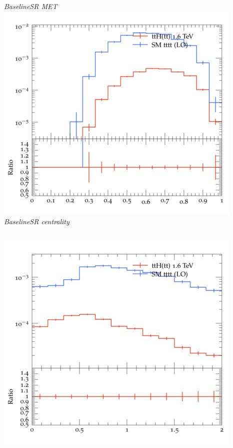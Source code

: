 \documentclass{beamer}
\begin{document}
\begin{frame}
\begin{columns}
\textit{\small BaselineSR MET}
\includegraphics[width=\textwidth]{../plots/ttH_1600/tttt_ttH_1LOS/BaselineSR_centrality.png}\\
\textit{\small BaselineSR centrality}
\end{columns}
\begin{columns}
\includegraphics[width=\textwidth]{../plots/ttH_1600/tttt_ttH_1LOS/BaselineSR_deltaR_bl_min.png}\\

\end{columns}
\end{frame}
\end{document}
